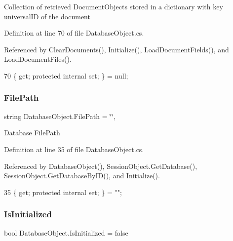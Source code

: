 Collection of retrieved Document\+Objects stored in a dictionary with key universal\+ID of the document 



Definition at line 70 of file Database\+Object.\+cs.



Referenced by Clear\+Documents(), Initialize(), Load\+Document\+Fields(), and Load\+Document\+Files().


\begin{DoxyCode}
70 \{ \textcolor{keyword}{get}; \textcolor{keyword}{protected} \textcolor{keyword}{internal} \textcolor{keyword}{set}; \} = null;
\end{DoxyCode}
\mbox{\label{class_database_object_a38a1a78430c6cd1fc4eef054e39145ce}} 
\subsubsection{\texorpdfstring{File\+Path}{FilePath}}
{\footnotesize\ttfamily string Database\+Object.\+File\+Path = \char`\"{}\char`\"{}\hspace{0.3cm}{\ttfamily [get]}, {\ttfamily [set]}}



Database File\+Path 



Definition at line 35 of file Database\+Object.\+cs.



Referenced by Database\+Object(), Session\+Object.\+Get\+Database(), Session\+Object.\+Get\+Database\+By\+I\+D(), and Initialize().


\begin{DoxyCode}
35 \{ \textcolor{keyword}{get}; \textcolor{keyword}{protected} \textcolor{keyword}{internal} \textcolor{keyword}{set}; \} = \textcolor{stringliteral}{""};
\end{DoxyCode}
\mbox{\label{class_database_object_a5fe036d32a30eb10d1b3f6a30263f740}} 
\subsubsection{\texorpdfstring{Is\+Initialized}{IsInitialized}}
{\footnotesize\ttfamily bool Database\+Object.\+Is\+Initialized = false\hspace{0.3cm}{\ttfamily [get]}}



